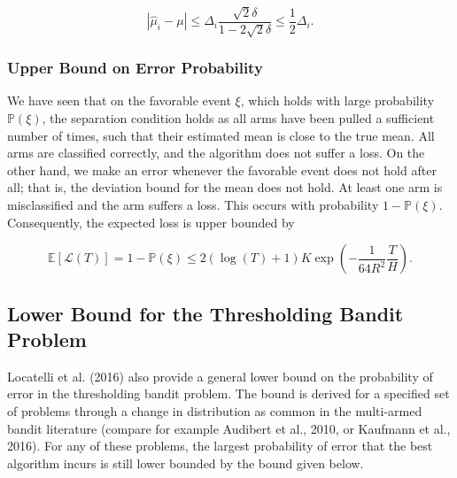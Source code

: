 \documentclass[11pt,]{article}
\begin{document}
\[
|\hat{\mu}_i - \mu | \leq \Delta_i \frac{\sqrt{2}\delta}{1-2\sqrt{2}\delta} \leq \frac{1}{2}\Delta_i.
\]

\subsubsection{Upper Bound on Error
Probability}\label{upper-bound-on-error-probability}

We have seen that on the favorable event \(\xi\), which holds with large
probability \(\mathbb{P}(\xi)\), the separation condition holds as all
arms have been pulled a sufficient number of times, such that their
estimated mean is close to the true mean. All arms are classified
correctly, and the algorithm does not suffer a loss. On the other hand,
we make an error whenever the favorable event does not hold after all;
that is, the deviation bound for the mean does not hold. At least one
arm is misclassified and the arm suffers a loss. This occurs with
probability \(1-\mathbb{P}(\xi)\). Consequently, the expected loss is
upper bounded by

\[
\mathbb{E}[\mathcal{L}(T)] = 1 - \mathbb{P}(\xi) \leq 2(\log(T)+1)K \exp(-\frac{1}{64R^2}\frac{T}{H}).
\]

\subsection{\texorpdfstring{Lower Bound for the Thresholding Bandit
Problem
\label{sec:LowerBoundLocatelli}}{Lower Bound for the Thresholding Bandit Problem }}\label{lower-bound-for-the-thresholding-bandit-problem}

Locatelli et al. (2016) also provide a general lower bound on the
probability of error in the thresholding bandit problem. The bound is
derived for a specified set of problems through a change in distribution
as common in the multi-armed bandit literature (compare for example
Audibert et al., 2010, or Kaufmann et al., 2016). For any of these
problems, the largest probability of error that the best algorithm
incurs is still lower bounded by the bound given below.
\end{document}
